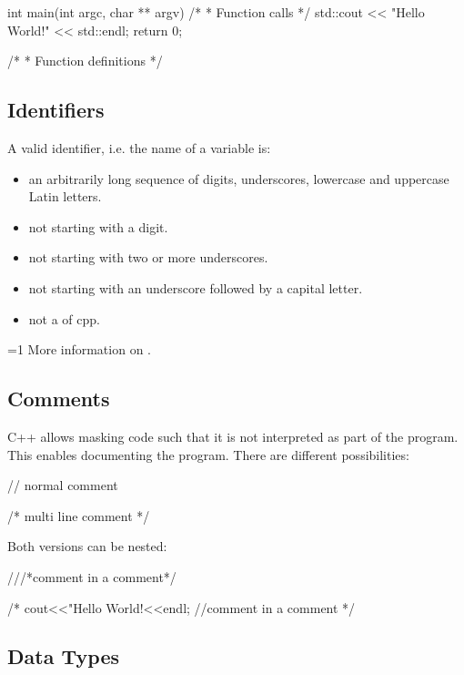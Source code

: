 \documentclass[10pt,a4paper]{scrartcl}
\gdef\conditionmacro{1}
\begin{document}
\begin{multicols*}{2}
\begin{TPCpp}
int main(int argc, char ** argv)
{
	  /*
	   * Function calls
	   */
    std::cout << "Hello World!" << std::endl;
    return 0;
}

/*
 * Function definitions
 */
\end{TPCpp}

\subsection{Identifiers}

A valid identifier, i.e. the name of a variable is:

\begin{itemize}
\item an arbitrarily long sequence of digits, underscores, lowercase and uppercase Latin letters.
\item not starting with a digit.
\item not starting with two or more underscores.
\item not starting with an underscore followed by a capital letter.
\item not a  of cpp.
\end{itemize}

\ifnum\conditionmacro=1
More information on .
\fi

\subsection{Comments}

C++ allows masking code such that it is not interpreted as part of the program. This enables documenting the program. There are different possibilities:

\begin{TPCpp}
// normal comment

/*
multi
line
comment
*/
\end{TPCpp}

Both versions can be nested:

\begin{TPCpp}
///*comment in a comment*/

/*
cout<<"Hello World!<<endl; //comment in a comment
*/
\end{TPCpp}

\subsection{Data Types}


\end{multicols*}
\end{document}
